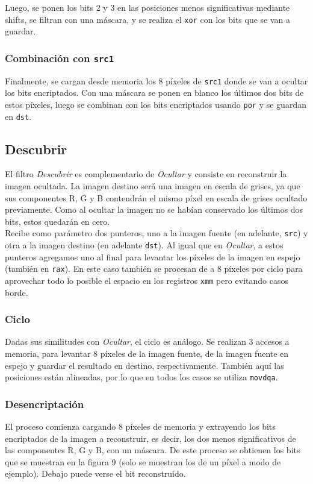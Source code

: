 \documentclass[a4paper]{article}
\begin{document}
Luego, se ponen los bits 2 y 3 en las posiciones menos significativas mediante shifts, se filtran con una máscara, y se realiza el {\tt xor} con los bits que se van a guardar.

\subsubsection{Combinación con {\tt src1}}
Finalmente, se cargan desde memoria los 8 píxeles de {\tt src1} donde se van a ocultar los bits encriptados. Con una máscara se ponen en blanco los últimos dos bits de estos píxeles, luego se combinan con los bits encriptados usando {\tt por} y se guardan en {\tt dst}.


\subsection{Descubrir}
El filtro \textit{Descubrir} es complementario de \textit{Ocultar} y consiste en reconstruir la imagen ocultada. La imagen destino será una imagen en escala de grises, ya que sus componentes R, G y B contendrán el mismo píxel en escala de grises ocultado previamente. Como al ocultar la imagen no se habían conservado los últimos dos bits, estos quedarán en cero. \\
Recibe como parámetro dos punteros, uno a la imagen fuente (en adelante, {\tt src}) y otra a la imagen destino (en adelante {\tt dst}). Al igual que en \textit{Ocultar}, a estos punteros agregamos uno al final para levantar los píxeles de la imagen en espejo (también en {\tt rax}). En este caso también se procesan de a 8 píxeles por ciclo para aprovechar todo lo posible el espacio en los registros {\tt xmm} pero evitando casos borde.

\subsubsection{Ciclo}
Dadas sus similitudes con \textit{Ocultar}, el ciclo es análogo. Se realizan 3 accesos a memoria, para levantar 8 píxeles de la imagen fuente, de la imagen fuente en espejo y guardar el resultado en destino, respectivamente. También aquí las posiciones están alineadas, por lo que en todos los casos se utiliza {\tt movdqa}.

\subsubsection{Desencriptación}
El proceso comienza cargando 8 píxeles de memoria y extrayendo los bits encriptados de la imagen a reconstruir, es decir, los dos menos significativos de las componentes R, G y B, con un máscara. De este proceso se obtienen los bits que se muestran en la figura 9 (solo se muestran los de un píxel a modo de ejemplo). Debajo puede verse el bit reconstruido.
\end{document}
